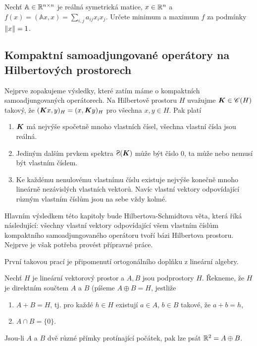 \begin{exercise}
Nechť $\mathbb{A} \in \mathbb{R}^{n \times n}$ je reálná symetrická matice, $x \in \mathbb{R}^n$ a $f(x) = (\mathbb{A} x,x) = \sum_{i,j} a_{ij} x_i x_j$. Určete minimum a maximum $f$ za podmínky $\left\lVert x\right\rVert =1$.
\end{exercise}

\subsection{Kompaktní samoadjungované operátory na Hilbertových prostorech}

Nejprve zopakujeme výsledky, které zatím máme o kompaktních samoadjungovaných operátorech. Na Hilbertově prostoru $H$ uvažujme $\boldsymbol{K} \in \mathscr{C} (H)$ takový, že $(\boldsymbol{K} x,y)_H = (x, \boldsymbol{K} y)_H$ pro všechna $x,y \in H$. Pak platí \begin{enumerate}
    \item $\boldsymbol{K}$ má nejvýše spočetně mnoho vlastních čísel, všechna vlastní čísla jsou reálná.
    \item Jediným dalším prvkem spektra $\Sp(\map K)$ může být číslo $0$, ta může nebo nemusí být vlastním číslem.
    \item Ke každému nenulovému vlastnímu číslu existuje nejvýše konečně mnoho lineárně nezávislých vlastních vektorů. Navíc vlastní vektory odpovídající různým vlastním číslům jsou na sebe vždy kolmé.
\end{enumerate}

Hlavním výsledkem této kapitoly bude Hilbertova-Schmidtova věta, která říká následující: všechny vlastní vektory odpovídající všem vlastním číslům kompaktního samoadjungovaného operátoru tvoří bázi Hilbertova prostoru. Nejprve je však potřeba provést přípravné práce.

První takovou prací je připomenutí ortogonálního doplňku z lineární algebry.
\begin{definition}
Nechť $H$ je lineární vektorový prostor a $A,B$ jsou podprostory $H$. Řekneme, že $H$ je direktním součtem $A$ a $B$ (píšeme $A \oplus B = H$, jestliže \begin{enumerate}
    \item $A+B=H$, tj. pro každé $h \in H$ existují $a \in A$, $b \in B$ takové, že $a+b=h$,
    \item $A \cap B = \{0 \}$.
\end{enumerate}
\end{definition}

\begin{example}
Jsou-li $A$ a $B$ dvě různé přímky protínající počátek, pak lze psát $\mathbb{R}^2 = A \oplus B$.
\end{example}

